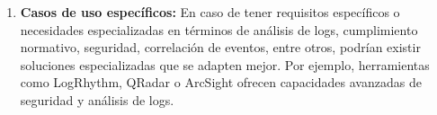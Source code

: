 \begin{enumerate}
\item \textbf{Casos de uso específicos:} En caso de tener requisitos específicos o necesidades especializadas en términos de análisis de logs, cumplimiento normativo, seguridad, correlación de eventos, entre otros, podrían existir soluciones especializadas que se adapten mejor. Por ejemplo, herramientas como LogRhythm, QRadar o ArcSight ofrecen capacidades avanzadas de seguridad y análisis de logs. 

\end{enumerate}

\clearpage
